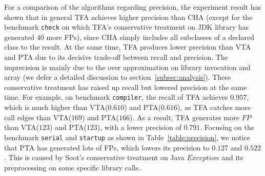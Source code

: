 \documentclass{fac}
\begin{document}

For a comparison of the algorithms regarding precision, the experiment result has shown that in general TFA achieves higher precision than CHA (except for the benchmark \texttt{check} on which TFA's conservative treatment on JDK library has generated $40$ more FPs), since CHA simply includes all subclasses of a declared class to the result. At the same time, TFA produces lower precision than VTA and PTA due to its decisive trade-off between recall and precision. The imprecision is mainly due to the over approximation on library invocation and array (we defer a detailed discussion to section~\ref{subsec:analysis}). These conservative treatment has raised up recall but lowered precision at the same time. For example, on benchmark \texttt{compiler}, the recall of TFA achieves $0.957$, which is much higher than VTA($0.610$) and PTA($0.616$), as TFA catches more call edges than VTA($169$) and PTA($166$). As a result, TFA generates more $FP$ than VTA($123$) and PTA($123$), with a lower precision of $0.791$. Focusing on the benchmark \texttt{serial} and \texttt{startup} as shown in Table~\ref{table:precision}, we notice that PTA has generated lots of FPs, which lowers its precision to $0.127$ and $0.522$. This is caused by Soot's conservative treatment on Java $Exception$ and its preprocessing on some specific library calls. %
\end{document}

